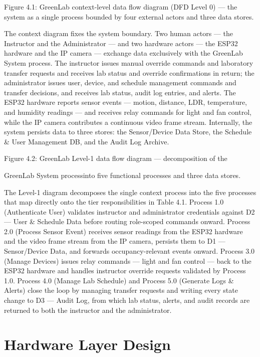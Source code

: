 Figure 4.1: GreenLab context-level data flow diagram (DFD Level 0) --- the system as a
single process bounded by four external actors and three data stores.

The context diagram fixes the system boundary. Two human actors --- the Instructor and
the Administrator --- and two hardware actors --- the ESP32 hardware and the IP camera
--- exchange data exclusively with the GreenLab System process. The instructor issues
manual override commands and laboratory transfer requests and receives lab status and
override confirmations in return; the administrator issues user, device, and schedule
management commands and transfer decisions, and receives lab status, audit log entries,
and alerts. The ESP32 hardware reports sensor events --- motion, distance, LDR,
temperature, and humidity readings --- and receives relay commands for light and fan
control, while the IP camera contributes a continuous video frame stream. Internally, the
system persists data to three stores: the Sensor/Device Data Store, the Schedule \& User
Management DB, and the Audit Log Archive.




Figure 4.2: GreenLab Level-1 data flow diagram --- decomposition of the

GreenLab System processinto five functional processes and three data stores.

The Level-1 diagram decomposes the single context process into the five processes that
map directly onto the tier responsibilities in Table 4.1. Process 1.0 (Authenticate User)
validates instructor and administrator credentials against D2 --- User \& Schedule Data
before routing role-scoped commands onward. Process 2.0 (Process Sensor Event)
receives sensor readings from the ESP32 hardware and the video frame stream from the
IP camera, persists them to D1 --- Sensor/Device Data, and forwards occupancy-relevant
events onward. Process 3.0 (Manage Devices) issues relay commands --- light and fan
control --- back to the ESP32 hardware and handles instructor override requests
validated by Process 1.0. Process 4.0 (Manage Lab Schedule) and Process 5.0 (Generate
Logs \& Alerts) close the loop by managing transfer requests and writing every state
change to D3 --- Audit Log, from which lab status, alerts, and audit records are returned
to both the instructor and the administrator.


\section{Hardware Layer Design}



